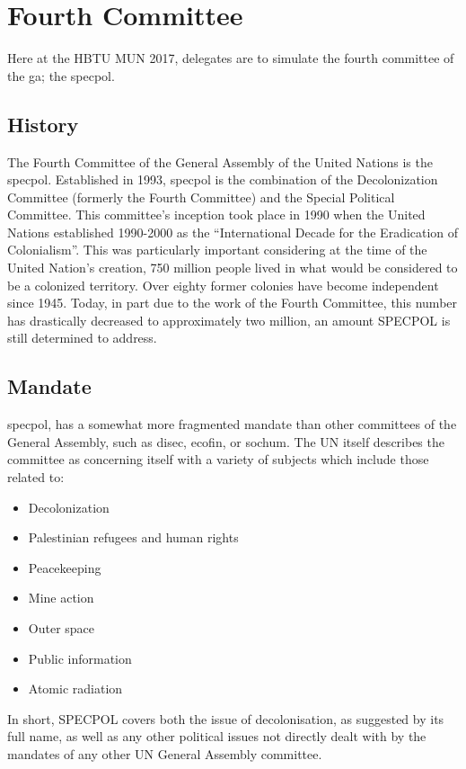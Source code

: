 \chapter{Fourth Committee}
Here at the HBTU MUN 2017, delegates are to simulate the fourth committee of the \acrfull{ga}; the \acrfull{specpol}.

\section{History}
The Fourth Committee of the General Assembly of the United Nations is the \acrfull{specpol}. Established in 1993, \acrshort{specpol} is the combination of the Decolonization Committee (formerly the Fourth Committee) and the Special Political Committee. This committee’s inception took place in 1990 when the United Nations established 1990-2000 as the ``International Decade for the Eradication of Colonialism''. This was particularly important considering at the time of the United Nation’s creation, 750 million people lived in what would be considered to be a colonized territory. Over eighty former colonies have become independent since 1945. Today, in part due to the work of the Fourth Committee, this number has drastically decreased to approximately two million, an amount SPECPOL is still determined to address.

\section{Mandate}
\acrfull{specpol}, has a somewhat more fragmented mandate 
than other committees of the General Assembly, such as \acrshort{disec}, \acrshort{ecofin}, or \acrshort{sochum}. The UN itself describes the committee as concerning itself with a variety of subjects which include those related to:
\begin{itemize}
	\item Decolonization
	\item Palestinian refugees and human rights
	\item Peacekeeping
	\item Mine action
	\item Outer space
	\item Public information
	\item Atomic radiation 
\end{itemize}

In short, SPECPOL covers both the issue of decolonisation, as suggested by its full name, as well as any other political issues not directly dealt with by the mandates of any other UN General Assembly committee.

